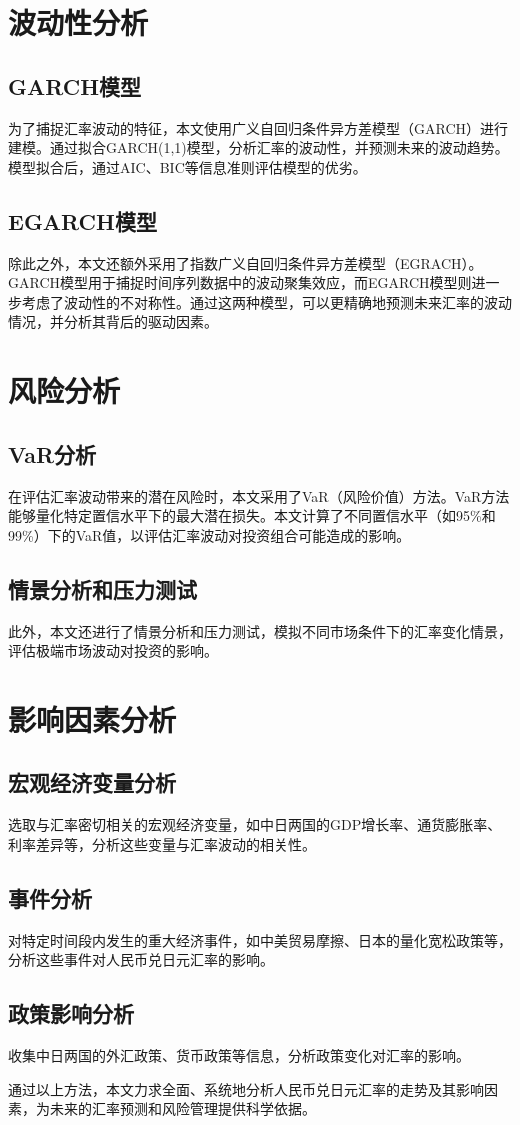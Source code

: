 \section{波动性分析}
\subsection{GARCH模型}
为了捕捉汇率波动的特征，本文使用广义自回归条件异方差模型（GARCH）进行建模。通过拟合GARCH(1,1)模型，分析汇率的波动性，并预测未来的波动趋势。模型拟合后，通过AIC、BIC等信息准则评估模型的优劣。
\subsection{EGARCH模型}
除此之外，本文还额外采用了指数广义自回归条件异方差模型（EGRACH）。GARCH模型用于捕捉时间序列数据中的波动聚集效应，而EGARCH模型则进一步考虑了波动性的不对称性。通过这两种模型，可以更精确地预测未来汇率的波动情况，并分析其背后的驱动因素。

\section{风险分析}
\subsection{VaR分析}
在评估汇率波动带来的潜在风险时，本文采用了VaR（风险价值）方法。VaR方法能够量化特定置信水平下的最大潜在损失。本文计算了不同置信水平（如95\%和99\%）下的VaR值，以评估汇率波动对投资组合可能造成的影响。
\subsection{情景分析和压力测试}
此外，本文还进行了情景分析和压力测试，模拟不同市场条件下的汇率变化情景，评估极端市场波动对投资的影响。

\section{影响因素分析}
\subsection{宏观经济变量分析}
选取与汇率密切相关的宏观经济变量，如中日两国的GDP增长率、通货膨胀率、利率差异等，分析这些变量与汇率波动的相关性。
\subsection{事件分析}
对特定时间段内发生的重大经济事件，如中美贸易摩擦、日本的量化宽松政策等，分析这些事件对人民币兑日元汇率的影响。
\subsection{政策影响分析}
收集中日两国的外汇政策、货币政策等信息，分析政策变化对汇率的影响。

通过以上方法，本文力求全面、系统地分析人民币兑日元汇率的走势及其影响因素，为未来的汇率预测和风险管理提供科学依据。